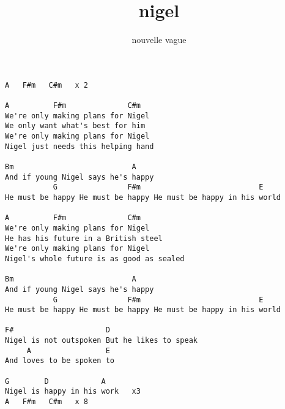 \author{nouvelle vague}
\title{nigel}
\maketitle
\begin{verbatim}
A   F#m   C#m   x 2

A          F#m              C#m
We're only making plans for Nigel 
We only want what's best for him 
We're only making plans for Nigel 
Nigel just needs this helping hand 

Bm                           A 
And if young Nigel says he's happy 
           G                F#m                           E
He must be happy He must be happy He must be happy in his world

A          F#m              C#m
We're only making plans for Nigel 
He has his future in a British steel 
We're only making plans for Nigel 
Nigel's whole future is as good as sealed 

Bm                           A
And if young Nigel says he's happy 
           G                F#m                           E
He must be happy He must be happy He must be happy in his world

F#                     D 
Nigel is not outspoken But he likes to speak
     A                 E 
And loves to be spoken to

G        D            A
Nigel is happy in his work   x3
A   F#m   C#m   x 8
\end{verbatim}